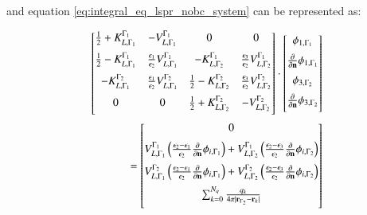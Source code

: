 and equation \eqref{eq:integral_eq_lspr_nobc_system} can be represented as:

\begin{align} \label{eq:matrix_multi}
 \left[
    \begin{matrix} 
       \frac{1}{2}+K_{L, \Gamma_1}^{\Gamma_1} & -V_{L, \Gamma_1}^{\Gamma_1} & 0 &  0   \vspace{0.2cm} \\
       \frac{1}{2}-K_{L, \Gamma_1}^{\Gamma_1} & \frac{\epsilon_1}{\epsilon_2} V_{L, \Gamma_1}^{\Gamma_1} & -K_{L, \Gamma_2}^{\Gamma_1} & \frac{\epsilon_3}{\epsilon_2} V_{L, \Gamma_2}^{\Gamma_1} \vspace{0.2cm}  \\
        -K_{L, \Gamma_1}^{\Gamma_2}&\frac{\epsilon_1}{\epsilon_2} V_{L, \Gamma_1}^{\Gamma_2} & \frac{1}{2}-K_{L, \Gamma_2}^{\Gamma_2}  &  \frac{\epsilon_3}{\epsilon_2} V_{L, \Gamma_2}^{\Gamma_2} \vspace{0.2cm} \\
       0 & 0 & \frac{1}{2}+K_{L, \Gamma_2}^{\Gamma_2}&  - V_{L, \Gamma_2}^{\Gamma_2}   \vspace{0.2cm} \\
    \end{matrix}
    \right] 
\cdot
 \left[
    \begin{matrix}
    \phi_{1,\Gamma_1} \vspace{0.2cm} \\
    \frac{\partial}{\partial \mathbf{n}} \phi_{1,\Gamma_1} \vspace{0.2cm} \\
    \phi_{3,\Gamma_2} \vspace{0.2cm} \\
    \frac{\partial}{\partial \mathbf{n}} \phi_{3,\Gamma_2} \vspace{0.2cm} \\
    \end{matrix}
\right]&
 \nonumber \\
 = \left[
    \begin{matrix}
    0 \vspace{0.2cm} \\
    V_{L,\Gamma_1}^{\Gamma_1} \left(\frac{\epsilon_2-\epsilon_1}{\epsilon_2}\frac{\partial}{\partial \mathbf{n}}\phi_{i,\Gamma_1} \right)
    + V_{L,\Gamma_2}^{\Gamma_1} \left(\frac{\epsilon_2 -\epsilon_3}{\epsilon_2}\frac{\partial}{\partial \mathbf{n}}\phi_{i,\Gamma_2} \right)
    \vspace{0.2cm}\\
    V_{L,\Gamma_1}^{\Gamma_2} \left(\frac{\epsilon_2-\epsilon_1}{\epsilon_2}\frac{\partial}{\partial \mathbf{n}}\phi_{i,\Gamma_1} \right)
    + V_{L,\Gamma_2}^{\Gamma_2} \left(\frac{\epsilon_2 -\epsilon_3}{\epsilon_2}\frac{\partial}{\partial \mathbf{n}}\phi_{i,\Gamma_2} \right)
    \vspace{0.2cm}\\
    \sum_{k=0}^{N_q} \frac{q_k}{4\pi|\mathbf{r}_{\Gamma_2} - \mathbf{r}_k|} \vspace{0.2cm}  \\
    \end{matrix}
\right]&
\end{align}


